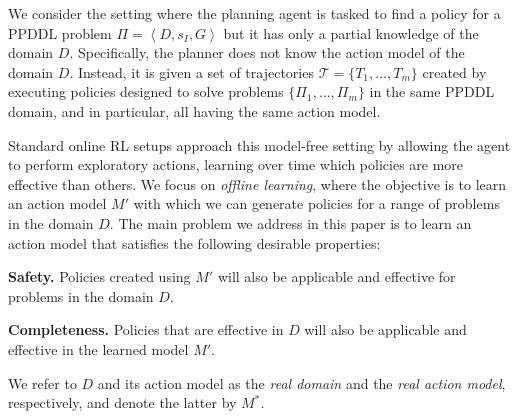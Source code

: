 \documentclass[letterpaper]{article} %
\newcommand{\tuple}[1]{\ensuremath{\left \langle #1 \right \rangle }}
\begin{document}


We consider the setting where the planning agent is tasked to find a policy for a PPDDL problem
$\Pi=\tuple{D, s_I, G}$ but it has only a partial knowledge of the domain $D$.  %
Specifically, the planner does not know the action model of the domain $D$. 
Instead, it is given a set of trajectories $\mathcal{T}=\{T_1,\ldots, T_m\}$ created by executing policies designed to solve problems 
$\{ \Pi_1,\ldots,\Pi_m \}$ in the same PPDDL domain, and in particular, all having the same action model. 


Standard online RL setups approach this model-free setting by allowing the agent to perform exploratory actions, learning over time which policies are more effective than others. 
We focus on \emph{offline learning},  where the 
objective is to learn an action model $M'$ with which we can generate policies for a range of problems in the domain $D$. 
The main problem we address in this paper is to learn an action model that satisfies the following desirable properties:
\begin{compactenum}
    \item \textbf{Safety.} Policies created using $M'$ will also be applicable and effective for problems in the domain $D$.
    \item \textbf{Completeness.} Policies that are effective in $D$ will also be applicable and effective in the learned model $M'$.
\end{compactenum}
We refer to $D$ and its action model as the \emph{real domain} and the \emph{real action model}, respectively, and denote the latter by $M^*$. 
\end{document}
